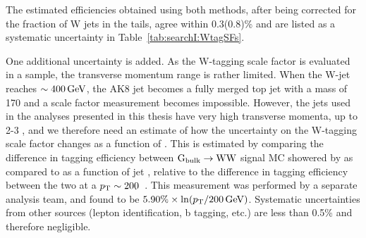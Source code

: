 The estimated efficiencies obtained using both methods, after being corrected for the fraction of W jets in the tails, agree within 0.3(0.8)\% and are listed as a systematic uncertainty in Table~\ref{tab:searchI:WtagSFs}.\par
One additional uncertainty is added. As the W-tagging scale factor is evaluated in a \ttbar sample, the transverse momentum range is rather limited. When the W-jet \PT reaches $\sim 400 \,\text{Ge\hspace{-.08em}V}$, the AK8 jet becomes a fully merged top jet with a mass of 170 \GeV and a scale factor measurement becomes impossible. However, the jets used in the analyses presented in this thesis have very high transverse momenta, up to 2-3 \TeV, and we therefore need an estimate of how the uncertainty on the W-tagging scale factor changes as a function of \PT. This is estimated by comparing the difference in tagging efficiency between $\mathrm{G}_\mathrm{bulk} \rightarrow \mathrm{W} \mathrm{W}$ signal MC showered by  as compared to \HERWIG{++} as a function of jet \PT, relative to the difference in tagging efficiency between the two at a $p_{\mathrm{T}} \sim 200$~\GeV. This measurement was performed by a separate analysis team, and found to be $5.90\% \times \ln(p_{\mathrm{T}}/200\,\text{Ge\hspace{-.08em}V})$.
Systematic uncertainties from other sources (lepton identification, b tagging, etc.) are less than 0.5\% and therefore negligible.

